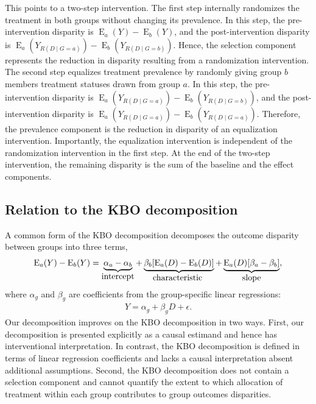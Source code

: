 \documentclass[12pt,a4paper]{article}
\newcommand{\E}{\operatorname{E}}
\begin{document}
This points to a two-step intervention. The first step internally randomizes the treatment in both groups without changing its prevalence. In this step, the pre-intervention disparity is $\E_a(Y) - \E_b(Y)$, and the post-intervention disparity is $\E_a \left(Y_{R(D \mid G=a)} \right) - \E_b \left(Y_{R(D \mid G=b)}\right)$. Hence, the selection component represents the reduction in disparity resulting from a randomization intervention. The second step equalizes treatment prevalence by randomly giving group $b$ members treatment statuses drawn from group $a$. In this step, the pre-intervention disparity is $\E_a \left(Y_{R(D \mid G=a)} \right) - \E_b \left(Y_{R(D \mid G=b)}\right)$, and the post-intervention disparity is $\E_a \left(Y_{R(D \mid G=a)} \right)-\E_b \left(Y_{R(D \mid G=a)} \right)$. Therefore, the prevalence component is the reduction in disparity of an equalization intervention. Importantly, the equalization intervention is independent of the randomization intervention in the first step. At the end of the two-step intervention, the remaining disparity is the sum of the baseline and the effect components.

\subsection{Relation to the KBO decomposition}
A common form of the KBO decomposition decomposes the outcome disparity between groups into three terms, 
\begin{align*}
\E_a(Y)-\E_b(Y) = \underbrace{\alpha_a-\alpha_b }_{\text{\normalsize intercept}}
+ \underbrace{\beta_b [\E_a(D)-\E_b(D)]}_{\text{\normalsize characteristic }}
+ \underbrace{\E_a(D)[\beta_a - \beta_b ]}_{\text{\normalsize slope}},
\end{align*}
where $\alpha_g$ and $\beta_g$ are coefficients from the group-specific linear regressions:
\begin{gather*}
Y=\alpha_g+\beta_g D + \epsilon.
\end{gather*}
Our decomposition improves on the KBO decomposition in two ways. First, our decomposition is presented explicitly as a causal estimand and hence has interventional interpretation. 
In contrast, the KBO decomposition is defined in terms of linear regression coefficients and lacks a causal interpretation absent additional assumptions. Second, the KBO decomposition does not contain a selection component and cannot quantify the extent to which allocation of treatment within each group contributes to group outcomes disparities. 
\end{document}
